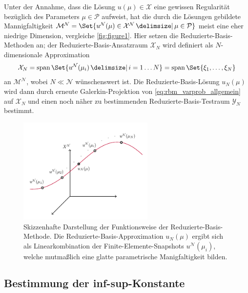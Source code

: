 \documentclass[../main.tex]{subfiles}
\begin{document}
Unter der Annahme, dass die Lösung $u(\mu) \in \mathcal X$ eine gewissen Regularität bezüglich des Parameters $\mu \in \mathcal P$ aufweist, hat die durch die Lösungen gebildete Mannigfaltigkeit $\mathcal M^{\mathcal N} = \Set{u^{\mathcal N}(\mu) \in \mathcal X^{\mathcal N} \given \mu \in \mathcal P}$ meist eine eher niedrige Dimension, vergleiche \autoref{fig:figure1}.
Hier setzen die Reduzierte-Basis-Methoden an; der Reduzierte-Basis-Ansatzraum $\mathcal X_{N}$ wird definiert als $N$-dimensionale Approximation
\begin{equation}
    \mathcal X_{N} = \spn\Set{u^{\mathcal N}(\mu_{i}) \given i = 1 \dots N} = \spn\Set{\xi_{1}, \dots, \xi_{N}}
\end{equation}
an $\mathcal M^{\mathcal N}$, wobei $N \ll \mathcal N$ wünschenswert ist.
Die Reduzierte-Basis-Lösung $u_{N}(\mu)$ wird dann durch erneute Galerkin-Projektion von \autoref{eq:rbm_varprob_allgemein} auf $\mathcal X_{N}$ und einen noch näher zu bestimmenden Reduzierte-Basis-Testraum $\mathcal Y_{N}$ bestimmt.

\begin{figure}[tb]
    \centering
    \includegraphics[width=0.6\textwidth]{figures/rb.pdf}
    \caption[%
    Skizzenhafte Darstellung der Funktionsweise der Reduzierte-Basis-Methode.
    ]{
        Skizzenhafte Darstellung der Funktionsweise der Reduzierte-Basis-Methode.
        Die Reduzierte-Basis-Approximation $u_{N}(\mu)$ ergibt sich als Linearkombination der Finite-Elemente-Snapshots $u^{\mathcal N}(\mu_{i})$, welche mutmaßlich eine glatte parametrische Manigfaltigkeit bilden.
        }
    \label{fig:figure1}
\end{figure}

\subsection{Bestimmung der inf-sup-Konstante} %
\label{sub:bestimmung_der_inf_sup_konstante}
\end{document}
